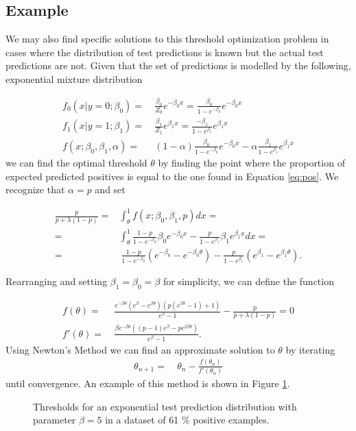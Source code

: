 \documentclass{article}
\begin{document}

\subsection{Example}

We may also find specific solutions to this threshold optimization problem in cases where the distribution of test predictions is known but the actual test predictions are not.
Given that the set of predictions is modelled by the following, exponential mixture distribution

\begin{align*}
    f_0(x\vert y=0;\beta_0) =& \ \frac{\beta_0}{Z_0}e^{-\beta_0 x} = \frac{\beta_0}{1-e^{-\beta_0}}e^{-\beta_0 x} \\
    f_1(x\vert y=1;\beta_1) =& \ \frac{\beta_1}{Z_1}e^{\beta_1 x} = \frac{-\beta_1}{1-e^{\beta_1}}e^{\beta_1 x}\\
    f (x;\beta_0,\beta_1,\alpha) =& \ (1-\alpha)\frac{\beta_0}{1-e^{-\beta_0}}e^{-\beta_0 x} - \alpha\frac{\beta_1}{1-e^{\beta_1}}e^{\beta_1 x} %
\end{align*}
we can find the optimal threshold $\theta$ by finding the point where the proportion of expected predicted positives is equal to the one found in Equation \ref{eq:pos}. We recognize that $\alpha = p$ and set

\begin{align}
    \frac{p}{p+\lambda(1-p)} = & \int_{\theta}^1 f(x;\beta_0, \beta_1, p) dx = \\
    = & \int_{\theta}^1 \frac{1-p}{1-e^{-\beta_0}}\beta_0e^{-\beta_0x} - \frac{p}{1-e^{\beta_1}}\beta_1e^{\beta_1x} dx = \\
    = & \ \frac{1-p}{1-e^{-\beta_0}}(e^{-\beta_0}-e^{-\beta_0 \theta}) - \frac{p}{1-e^{\beta_1}}(e^{\beta_1}-e^{\beta_1 \theta})\text{.}
\end{align}

Rearranging and setting $\beta_1 = \beta_0 = \beta$ for simplicity, we can define the function

\begin{align}
    f(\theta) =& \ \frac{e^{-\beta \theta} (e^\beta-e^{\beta \theta}) (p(e^{\beta \theta}-1) + 1)}{e^{\beta}-1} - \frac{p}{p+\lambda(1-p)} = 0 \\
    f'(\theta) =& \ \frac{\beta e^{-\beta \theta} ((p-1) e^\beta - p e^{2\beta \theta})}{e^{\beta}-1}\text{.}
\end{align}
Using Newton's Method we can find an approximate solution to $\theta$ by iterating
\begin{align}
    \theta_{n+1} =& \ \theta_n - \frac{f(\theta_n)}{f'(\theta_n)}
\end{align}
until convergence. An example of this method is shown in Figure \ref{fig:exp5}.
\begin{figure}
    \centering
    \scalebox{.8}{}
    \caption{Thresholds for an exponential test prediction distribution with parameter $\beta = 5$ in a dataset of 61 \% positive examples.}
    \label{fig:exp5}
\end{figure}
\end{document}
